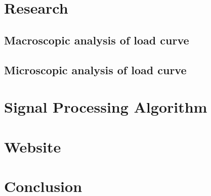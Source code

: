 \documentclass[10pt, english]{article}
\begin{document}
\section{Research}

\subsection{Macroscopic analysis of load curve}

\subsection{Microscopic analysis of load curve}

\section{Signal Processing Algorithm}

\section{Website}


\section{Conclusion}


\end{document}
